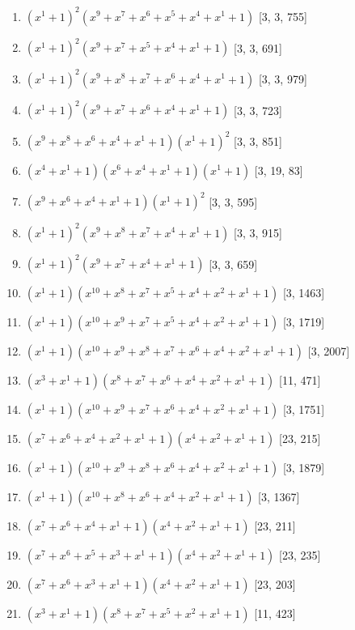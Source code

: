 \documentclass[10pt,twocolumn]{article}
\begin{document}
\begin{enumerate}
\item $(x^{1} + 1)^{2}(x^{9} + x^{7} + x^{6} + x^{5} + x^{4} + x^{1} + 1)$  [3, 3, 755]
\item $(x^{1} + 1)^{2}(x^{9} + x^{7} + x^{5} + x^{4} + x^{1} + 1)$  [3, 3, 691]
\item $(x^{1} + 1)^{2}(x^{9} + x^{8} + x^{7} + x^{6} + x^{4} + x^{1} + 1)$  [3, 3, 979]
\item $(x^{1} + 1)^{2}(x^{9} + x^{7} + x^{6} + x^{4} + x^{1} + 1)$  [3, 3, 723]
\item $(x^{9} + x^{8} + x^{6} + x^{4} + x^{1} + 1)(x^{1} + 1)^{2}$  [3, 3, 851]
\item $(x^{4} + x^{1} + 1)(x^{6} + x^{4} + x^{1} + 1)(x^{1} + 1)$  [3, 19, 83]
\item $(x^{9} + x^{6} + x^{4} + x^{1} + 1)(x^{1} + 1)^{2}$  [3, 3, 595]
\item $(x^{1} + 1)^{2}(x^{9} + x^{8} + x^{7} + x^{4} + x^{1} + 1)$  [3, 3, 915]
\item $(x^{1} + 1)^{2}(x^{9} + x^{7} + x^{4} + x^{1} + 1)$  [3, 3, 659]
\item $(x^{1} + 1)(x^{10} + x^{8} + x^{7} + x^{5} + x^{4} + x^{2} + x^{1} + 1)$  [3, 1463]
\item $(x^{1} + 1)(x^{10} + x^{9} + x^{7} + x^{5} + x^{4} + x^{2} + x^{1} + 1)$  [3, 1719]
\item $(x^{1} + 1)(x^{10} + x^{9} + x^{8} + x^{7} + x^{6} + x^{4} + x^{2} + x^{1} + 1)$  [3, 2007]
\item $(x^{3} + x^{1} + 1)(x^{8} + x^{7} + x^{6} + x^{4} + x^{2} + x^{1} + 1)$  [11, 471]
\item $(x^{1} + 1)(x^{10} + x^{9} + x^{7} + x^{6} + x^{4} + x^{2} + x^{1} + 1)$  [3, 1751]
\item $(x^{7} + x^{6} + x^{4} + x^{2} + x^{1} + 1)(x^{4} + x^{2} + x^{1} + 1)$  [23, 215]
\item $(x^{1} + 1)(x^{10} + x^{9} + x^{8} + x^{6} + x^{4} + x^{2} + x^{1} + 1)$  [3, 1879]
\item $(x^{1} + 1)(x^{10} + x^{8} + x^{6} + x^{4} + x^{2} + x^{1} + 1)$  [3, 1367]
\item $(x^{7} + x^{6} + x^{4} + x^{1} + 1)(x^{4} + x^{2} + x^{1} + 1)$  [23, 211]
\item $(x^{7} + x^{6} + x^{5} + x^{3} + x^{1} + 1)(x^{4} + x^{2} + x^{1} + 1)$  [23, 235]
\item $(x^{7} + x^{6} + x^{3} + x^{1} + 1)(x^{4} + x^{2} + x^{1} + 1)$  [23, 203]
\item $(x^{3} + x^{1} + 1)(x^{8} + x^{7} + x^{5} + x^{2} + x^{1} + 1)$  [11, 423]

\end{enumerate}
\end{document}
